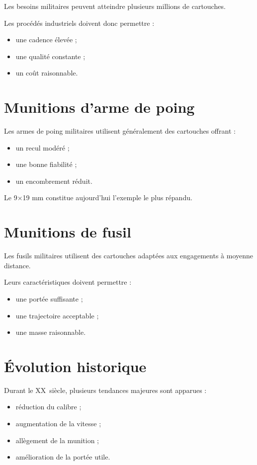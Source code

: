 Les besoins militaires peuvent atteindre plusieurs millions de cartouches.

Les procédés industriels doivent donc permettre :

\begin{itemize}
    \item une cadence élevée ;
    \item une qualité constante ;
    \item un coût raisonnable.
\end{itemize}

\section{Munitions d'arme de poing}

Les armes de poing militaires utilisent généralement des cartouches offrant :

\begin{itemize}
    \item un recul modéré ;
    \item une bonne fiabilité ;
    \item un encombrement réduit.
\end{itemize}

Le 9×19 mm constitue aujourd'hui l'exemple le plus répandu.

\section{Munitions de fusil}

Les fusils militaires utilisent des cartouches adaptées aux engagements à
moyenne distance.

Leurs caractéristiques doivent permettre :

\begin{itemize}
    \item une portée suffisante ;
    \item une trajectoire acceptable ;
    \item une masse raisonnable.
\end{itemize}

\section{Évolution historique}

Durant le XX\ieme\ siècle, plusieurs tendances majeures sont apparues :

\begin{itemize}
    \item réduction du calibre ;
    \item augmentation de la vitesse ;
    \item allègement de la munition ;
    \item amélioration de la portée utile.
\end{itemize}

